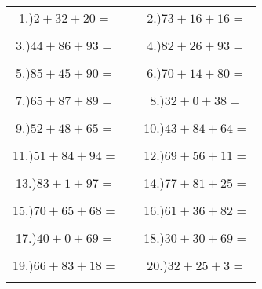 \documentclass{article}
\begin{document}
\begin{tabular}{ccc}
1.)$2+32+20=$& \hspace{5cm} &2.)$73+16+16=$\\\\
3.)$44+86+93=$& \hspace{5cm} &4.)$82+26+93=$\\\\
5.)$85+45+90=$& \hspace{5cm} &6.)$70+14+80=$\\\\
7.)$65+87+89=$& \hspace{5cm} &8.)$32+0+38=$\\\\
9.)$52+48+65=$& \hspace{5cm} &10.)$43+84+64=$\\\\
11.)$51+84+94=$& \hspace{5cm} &12.)$69+56+11=$\\\\
13.)$83+1+97=$& \hspace{5cm} &14.)$77+81+25=$\\\\
15.)$70+65+68=$& \hspace{5cm} &16.)$61+36+82=$\\\\
17.)$40+0+69=$& \hspace{5cm} &18.)$30+30+69=$\\\\
19.)$66+83+18=$& \hspace{5cm} &20.)$32+25+3=$\\\\
\end{tabular}
\newpage
\end{document}

